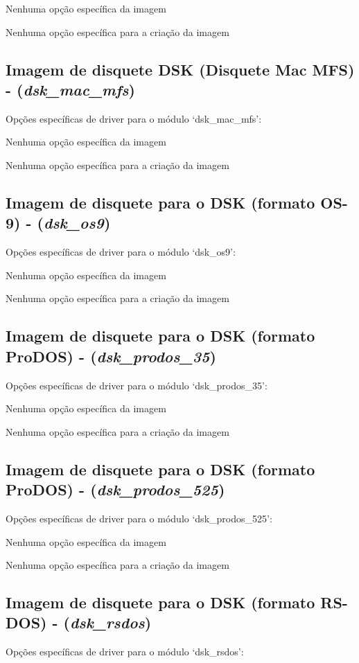 \documentclass[letterpaper,10pt,brazil]{sphinxmanual}
\begin{document}
Nenhuma opção específica da imagem

Nenhuma opção específica para a criação da imagem


\subsection{Imagem de disquete DSK (Disquete Mac MFS) - (\emph{dsk\_mac\_mfs})}
\label{tools/imgtool:imagem-de-disquete-dsk-disquete-mac-mfs-dsk-mac-mfs}
Opções específicas de driver para o módulo `dsk\_mac\_mfs':

Nenhuma opção específica da imagem

Nenhuma opção específica para a criação da imagem


\subsection{Imagem de disquete para o DSK (formato OS-9) - (\emph{dsk\_os9})}
\label{tools/imgtool:imagem-de-disquete-para-o-dsk-formato-os-9-dsk-os9}
Opções específicas de driver para o módulo `dsk\_os9':

Nenhuma opção específica da imagem

Nenhuma opção específica para a criação da imagem


\subsection{Imagem de disquete para o DSK (formato ProDOS) - (\emph{dsk\_prodos\_35})}
\label{tools/imgtool:imagem-de-disquete-para-o-dsk-formato-prodos-dsk-prodos-35}
Opções específicas de driver para o módulo `dsk\_prodos\_35':

Nenhuma opção específica da imagem

Nenhuma opção específica para a criação da imagem


\subsection{Imagem de disquete para o DSK (formato ProDOS) - (\emph{dsk\_prodos\_525})}
\label{tools/imgtool:imagem-de-disquete-para-o-dsk-formato-prodos-dsk-prodos-525}
Opções específicas de driver para o módulo `dsk\_prodos\_525':

Nenhuma opção específica da imagem

Nenhuma opção específica para a criação da imagem


\subsection{Imagem de disquete para o DSK (formato RS-DOS) - (\emph{dsk\_rsdos})}
\label{tools/imgtool:imagem-de-disquete-para-o-dsk-formato-rs-dos-dsk-rsdos}
Opções específicas de driver para o módulo `dsk\_rsdos':
\end{document}
